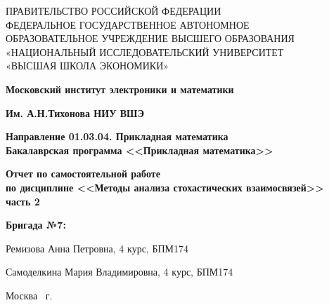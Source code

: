 \begin{titlepage}
	\begin{center}
		ПРАВИТЕЛЬСТВО РОССИЙСКОЙ ФЕДЕРАЦИИ \\
 		ФЕДЕРАЛЬНОЕ  ГОСУДАРСТВЕННОЕ АВТОНОМНОЕ \\
		ОБРАЗОВАТЕЛЬНОЕ УЧРЕЖДЕНИЕ ВЫСШЕГО ОБРАЗОВАНИЯ\\
		«НАЦИОНАЛЬНЫЙ ИССЛЕДОВАТЕЛЬСКИЙ УНИВЕРСИТЕТ\\
		«ВЫСШАЯ ШКОЛА ЭКОНОМИКИ»
	\end{center}
	
	\begin{center}
		\textbf{Московский институт электроники и математики}
		
		\textbf{Им. А.Н.Тихонова НИУ ВШЭ}
		
		\vspace{2ex}
		
		\textbf{Направление 01.03.04. Прикладная математика \\
			Бакалаврская программа <<Прикладная математика>>}
	\end{center}
	\vspace{1ex}	
	
	\vspace{1ex}
	\begin{center}
		\textbf{Отчет по самостоятельной работе \\
			по дисциплине <<Методы анализа стохастических взаимосвязей>>\\
			часть 2
	}
	\end{center}	

	\vspace{2ex}
	\vfill
	
	\vspace{2ex}
	
	\begin{flushright}
		\textbf{Бригада №7:}
		
		\vspace{2ex}
		
		Ремизова Анна Петровна, 4 курс, БПМ174
		
		Самоделкина Мария Владимировна, 4 курс, БПМ174

	\end{flushright}

	\vspace{5ex}
	\begin{center}
		Москва \the\year \, г.
	\end{center}
	
\end{titlepage}
\addtocounter{page}{1}